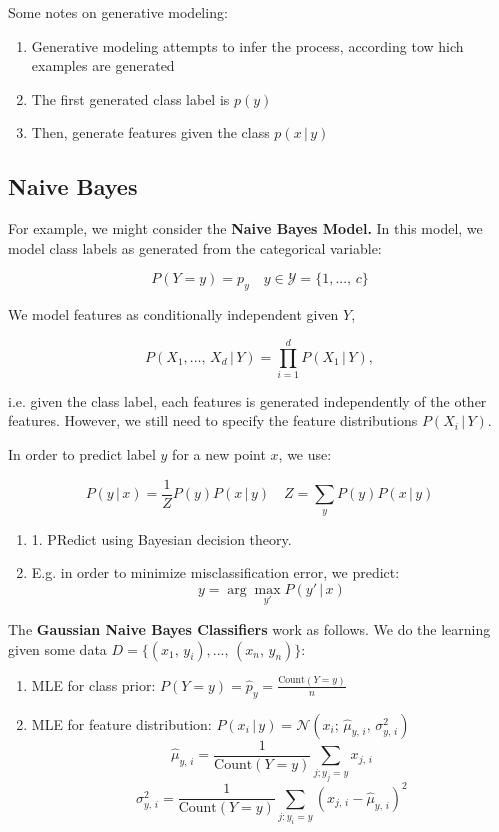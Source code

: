 \documentclass[a4paper]{extarticle}
\begin{document}
Some notes on generative modeling:
\begin{enumerate}
    \item Generative modeling attempts to infer the process, according tow hich examples are generated
    \item The first generated class label is $p(y)$
    \item Then, generate features given the class $p(x \, | \, y)$
\end{enumerate}

\subsection{Naive Bayes}

For example, we might consider the \textbf{Naive Bayes Model.} In this model, we model class labels as generated from the categorical variable:

\[
    P(Y = y) = p_y \quad y \in \mathcal{Y} = \{1,..., \, c\}
\]

We model features as conditionally independent given $Y$,

\[
    P(X_1,..., \, X_d \, | \, Y) = \prod_{i = 1}^d P(X_1 \, | \, Y),
\]

i.e. given the class label, each features is generated independently of the other features. However, we still need to specify the feature distributions $P(X_i \, | \, Y)$.

In order to predict label $y$ for a new point $x$, we use:

\[
    P(y \, | \, x) = \frac{1}{Z} P(y)P(x \, | \, y) \quad Z = \sum_y P(y)P(x \, | \, y)
\]

\begin{enumerate}
    \item 1. PRedict using Bayesian decision theory.
    \item E.g. in order to minimize misclassification error, we predict:
    \[
        y = \arg \max_{y'} P(y' \, | \, x)
    \]
\end{enumerate}

The \textbf{Gaussian Naive Bayes Classifiers} work as follows. We do the learning given some data $D = \{(x_1, \, y_i),..., \, (x_n, \, y_n)\}$:

\begin{enumerate}
    \item MLE for class prior: $P(Y = y) = \hat{p}_y = \frac{\text{Count}(Y = y)}{n}$
    \item MLE for feature distribution: $P(x_i \, | \, y) = \mathcal{N}(x_i; \, \hat{\mu}_{y, \, i}, \, \sigma^2_{y, \, i})$
    \[
        \hat{\mu}_{y, \, i} = \frac{1}{\text{Count}(Y = y)} \sum_{j;y_j = y}x_{j, \, i}
    \]
    \[
        \sigma^2_{y, \, i} = \frac{1}{\text{Count}(Y = y)} \sum_{j:y_i = y} (x_{j, \, i} - \hat{\mu}_{y, \, i})^2
    \]
\end{enumerate}
\end{document}
